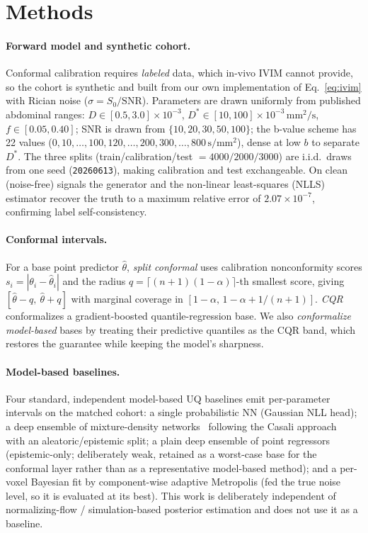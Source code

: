 \documentclass[11pt]{article}
\newcommand{\Dstar}{D^{*}}
\newcommand{\unit}[1]{\,\mathrm{#1}}
\begin{document}
\section{Methods}
\label{sec:methods}

\paragraph{Forward model and synthetic cohort.}
Conformal calibration requires \emph{labeled} data, which in-vivo IVIM cannot
provide, so the cohort is synthetic and built from our own implementation of
Eq.~\eqref{eq:ivim} with Rician noise ($\sigma = S_0/\mathrm{SNR}$). Parameters are
drawn uniformly from published abdominal ranges: $D\in[0.5,3.0]\times10^{-3}$,
$\Dstar\in[10,100]\times10^{-3}\unit{mm^2/s}$, $f\in[0.05,0.40]$; SNR is drawn from
$\{10,20,30,50,100\}$; the b-value scheme has 22 values
($0,10,\dots,100,120,\dots,200,300,\dots,800\unit{s/mm^2}$), dense at low $b$ to
separate $\Dstar$. The three splits (train/calibration/test $=4000/2000/3000$) are
i.i.d.\ draws from one seed (\texttt{20260613}), making calibration and test
exchangeable. On clean (noise-free) signals the generator and the non-linear
least-squares (NLLS) estimator recover the truth to a maximum relative error of
$2.07\times10^{-7}$, confirming label self-consistency.

\paragraph{Conformal intervals.}
For a base point predictor $\hat\theta$, \emph{split conformal} uses calibration
nonconformity scores $s_i = |\theta_i - \hat\theta_i|$ and the radius
$q=\lceil(n{+}1)(1-\alpha)\rceil$-th smallest score, giving
$[\hat\theta - q,\ \hat\theta + q]$ with marginal coverage in
$[1-\alpha,\,1-\alpha+1/(n{+}1)]$. \emph{CQR}~\citep{romano2019} conformalizes a
gradient-boosted quantile-regression base. We also \emph{conformalize model-based}
bases by treating their predictive quantiles as the CQR band, which restores the
guarantee while keeping the model's sharpness.

\paragraph{Model-based baselines.}
Four standard, independent model-based UQ baselines emit per-parameter intervals on
the matched cohort: a single probabilistic NN (Gaussian NLL head); a deep ensemble
of mixture-density networks~\citep{bishop1994,lakshminarayanan2017} following the
Casali approach~\citep{casali2026} with an aleatoric/epistemic split; a plain deep
ensemble of point regressors (epistemic-only; deliberately weak, retained as a
worst-case base for the conformal layer rather than as a representative model-based
method); and a per-voxel
Bayesian fit by component-wise adaptive Metropolis (fed the true noise level, so it
is evaluated at its best). This work is deliberately independent of normalizing-flow /
simulation-based posterior estimation and does not use it as a baseline.
\end{document}
